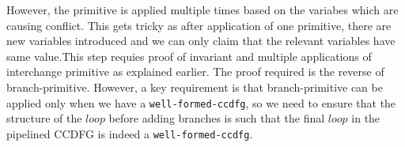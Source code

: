 However, the primitive is applied multiple times based on the variabes which are causing conflict. 
This gets tricky as after application of one primitive, there are new variables introduced and 
we can only claim that the relevant variables have same value.This step requies proof of invariant and multiple applications of interchange primitive as explained earlier. The proof required is the reverse of branch-primitive. However, a key requirement is that branch-primitive can be applied only when we have a {\tt well-formed-ccdfg}, so we need to ensure that the structure of the $loop$ before adding 
branches is such that the final $loop$ in the pipelined CCDFG is indeed a {\tt well-formed-ccdfg}.  


